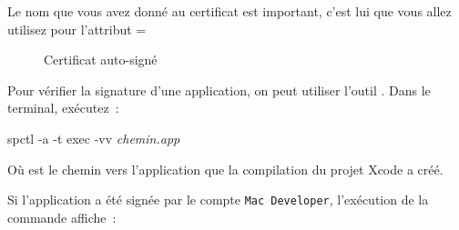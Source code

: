 Le nom que vous avez donné au certificat est important, c'est lui que vous allez utilisez pour l'attribut \ggs=%
\begin{galgas}
\end{galgas}


\begin{figure}[!t]
  \centering
  \hspace{0.5cm}
  \caption{Certificat auto-signé}
  \ligne
\end{figure}






Pour vérifier la signature d'une application, on peut utiliser l'outil . Dans le terminal, exécutez~:
\begin{SHELL}
spctl -a -t exec -vv \emph{chemin.app}
\end{SHELL}

Où  est le chemin vers l'application que la compilation du projet Xcode a créé.

Si l'application a été signée par le compte \texttt{Mac Developer}, l'exécution de la commande affiche~:

